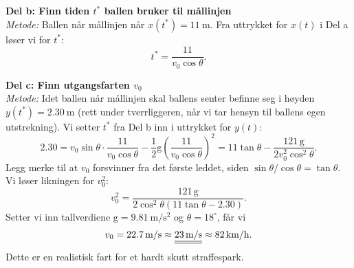 {    \textbf{Del b: Finn tiden $t^\ast$ ballen bruker til mållinjen} \\

    \textit{Metode:}
    Ballen når mållinjen når $x(t^\ast) = \SI{11}{\metre}$. Fra uttrykket for $x(t)$ i Del a løser vi for $t^\ast$:
    \[
    t^\ast = \frac{11}{v_0 \cos\theta}.
    \]

    \textbf{Del c: Finn utgangsfarten $v_0$} \\

    \textit{Metode:}
    Idet ballen når mållinjen skal ballens senter befinne seg i høyden $y(t^\ast) = \SI{2.30}{\metre}$ (rett under tverrliggeren, når vi tar hensyn til ballens egen utstrekning). Vi setter $t^\ast$ fra Del b inn i uttrykket for $y(t)$:
    \[
    2.30 = v_0 \sin\theta \cdot \frac{11}{v_0 \cos\theta} - \frac{1}{2} \mathrm{g} \left( \frac{11}{v_0 \cos\theta} \right)^2 = 11 \tan\theta - \frac{121\, \mathrm{g}}{2 v_0^2 \cos^2\theta}.
    \]
    Legg merke til at $v_0$ forsvinner fra det første leddet, siden $\sin\theta / \cos\theta = \tan\theta$. Vi løser likningen for $v_0^2$:
    \[
    v_0^2 = \frac{121\, \mathrm{g}}{2\cos^2\theta \left( 11\tan\theta - 2.30 \right)}.
    \]
    Setter vi inn tallverdiene $\mathrm{g} = \SI{9.81}{\metre\per\second\squared}$ og $\theta = 18^\circ$, får vi
    \[
    v_0 = 22.7\,\text{m/s} \approx \underline{\underline{23\,\text{m/s}}} \approx 82\,\text{km/h}.
    \]
    Dette er en realistisk fart for et hardt skutt straffespark.
}

